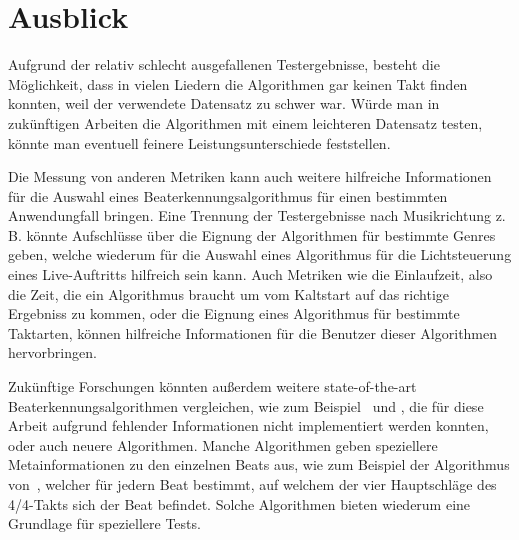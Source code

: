 \section{Ausblick}
{
	Aufgrund der relativ schlecht ausgefallenen Testergebnisse,
		besteht die Möglichkeit,
		dass in vielen Liedern die Algorithmen gar keinen Takt finden konnten,
		weil der verwendete Datensatz zu schwer war.
	Würde man in zukünftigen Arbeiten die Algorithmen mit einem leichteren Datensatz testen,
		könnte man eventuell feinere Leistungsunterschiede feststellen.

	Die Messung von anderen Metriken kann auch weitere hilfreiche Informationen für die Auswahl eines Beaterkennungsalgorithmus für einen bestimmten Anwendungfall bringen.
	Eine Trennung der Testergebnisse nach Musikrichtung z. B. könnte Aufschlüsse über die Eignung der Algorithmen für bestimmte Genres geben,
		welche wiederum für die Auswahl eines Algorithmus für die Lichtsteuerung eines Live-Auftritts hilfreich sein kann.
	Auch Metriken wie die Einlaufzeit,
		also die Zeit,
		die ein Algorithmus braucht um vom Kaltstart auf das richtige Ergebniss zu kommen,
		oder die Eignung eines Algorithmus für bestimmte Taktarten,
		können hilfreiche Informationen für die Benutzer dieser Algorithmen hervorbringen.

	Zukünftige Forschungen könnten außerdem weitere state-of-the-art Beaterkennungsalgorithmen vergleichen,
		wie zum Beispiel~\cite{2000_Di} und \cite{2001_Go},
		die für diese Arbeit aufgrund fehlender Informationen nicht implementiert werden konnten,
		oder auch neuere Algorithmen.
	Manche Algorithmen geben speziellere Metainformationen zu den einzelnen Beats aus,
		wie zum Beispiel der Algorithmus von~\cite{2001_Go},
		welcher für jedern Beat bestimmt,
		auf welchem der vier Hauptschläge des 4/4-Takts sich der Beat befindet.
	Solche Algorithmen bieten wiederum eine Grundlage für speziellere Tests.
}
